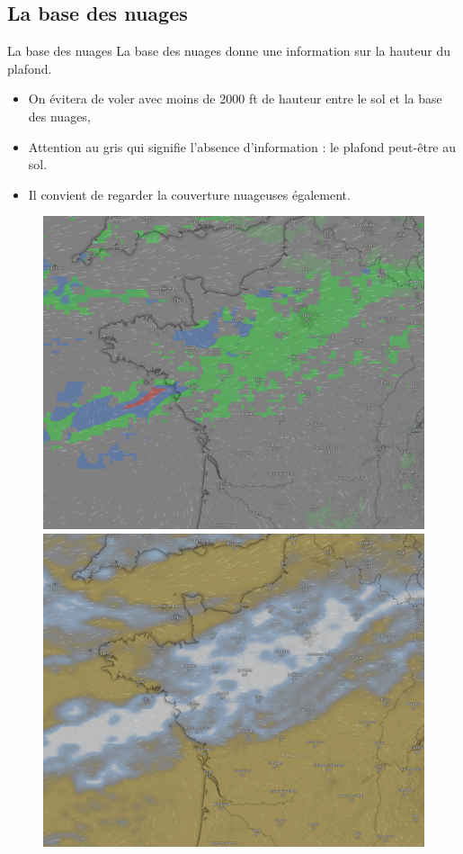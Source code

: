 \documentclass{beamer}
\begin{document}
\subsection{La base des nuages}
\begin{frame}{La base des nuages}
  La base des nuages donne une information sur la hauteur du plafond.
  \pause
  \begin{itemize}
    \item On évitera de voler avec moins de 2000 ft de hauteur entre le sol et la base des nuages, \pause
    \item Attention au gris qui signifie l'absence d'information : le plafond peut-être au sol. \pause
    \item Il convient de regarder la couverture nuageuses également. \pause
  \end{itemize}

  \begin{figure}
    \centering
    \includegraphics[scale=0.5]{images/windy-base-des-nuages.png}
    \includegraphics[scale=0.5]{images/windy-clouds.png}
  \end{figure}
\end{frame}
\end{document}
